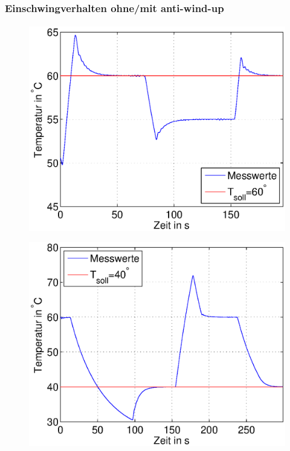 \begin{frame}
\begin{columns}[c]
\begin{figure}[H]
\begin{center}
            \end{center}
            \end{figure}
    \end{columns}
\end{frame}
\begin{frame}
    \frametitle{Einschwingverhalten ohne/mit anti-wind-up}
    \framesubtitle{}
        \begin{figure}[H]
        \begin{center}
                \includegraphics[scale=0.3]{./img/plots/2g_schwing.eps}
        \end{center}
        \end{figure}
        \begin{figure}[H]
        \begin{center}
                \includegraphics[scale=0.3]{./img/plots/2g_schwing_int.eps}
        \end{center}
        \end{figure}
\end{frame}
